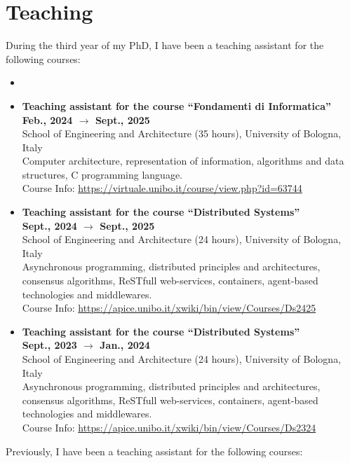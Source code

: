 \documentclass[11pt]{article}
\begin{document}
\section{Teaching}\label{sec:teaching}
%
During the third year of my PhD, I have been a teaching assistant for the following courses:
%
\begin{itemize}
	\item \item \textbf{Teaching assistant for the course ``Fondamenti di Informatica'' }
	\\\hfill \textbf{Feb., 2024 $\rightarrow$ Sept., 2025}
	\\School of Engineering and Architecture (35 hours), University of Bologna, Italy
	\\Computer architecture, representation of information, algorithms and data structures, C programming language.
	\\Course Info: \url{https://virtuale.unibo.it/course/view.php?id=63744}
	\item \textbf{Teaching assistant for the course ``Distributed Systems'' }
	\\\hfill \textbf{Sept., 2024 $\rightarrow$ Sept., 2025}
	\\School of Engineering and Architecture (24 hours), University of Bologna, Italy
	\\Asynchronous programming, distributed principles and architectures, consensus algorithms, ReSTfull web-services, containers, agent-based technologies and middlewares.
	\\Course Info: \url{https://apice.unibo.it/xwiki/bin/view/Courses/Ds2425}
	\item \textbf{ Teaching assistant for the course ``Distributed Systems'' }
	\\\hfill \textbf{Sept., 2023 $\rightarrow$ Jan., 2024}
	\\School of Engineering and Architecture (24 hours), University of Bologna, Italy
	\\Asynchronous programming, distributed principles and architectures, consensus algorithms, ReSTfull web-services, containers, agent-based technologies and middlewares.
	\\Course Info: \url{https://apice.unibo.it/xwiki/bin/view/Courses/Ds2324}
\end{itemize}
%
Previously, I have been a teaching assistant for the following courses:
%
\end{document}
